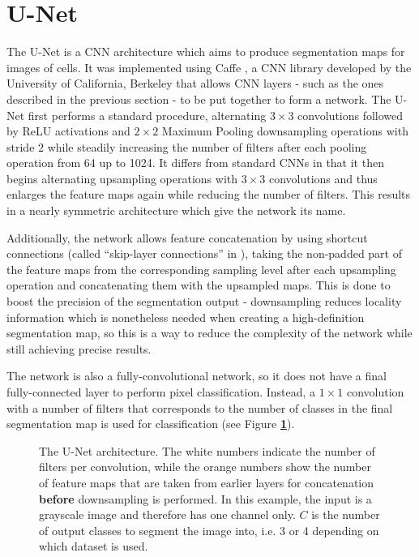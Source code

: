 	\section {U-Net}
The U-Net \cite{unet} is a CNN architecture which aims to produce segmentation maps for images of cells. It was implemented using Caffe \cite{caffe}, a CNN library developed by the University of California, Berkeley that allows CNN layers - such as the ones described in the previous section - to be put together to form a network. The U-Net first performs a standard procedure, alternating $3 \times 3$ convolutions followed by ReLU activations and $2 \times 2$ Maximum Pooling downsampling operations with stride $2$ while steadily increasing the number of filters after each pooling operation from 64 up to 1024. It differs from standard CNNs in that it then begins alternating upsampling operations with $3 \times 3$ convolutions and thus enlarges the feature maps again while reducing the number of filters. This results in a nearly symmetric architecture which give the network its name.

Additionally, the network allows feature concatenation by using shortcut connections (called ``skip-layer connections'' in \cite{bishop_pattern}), taking the non-padded part of the feature maps from the corresponding sampling level after each upsampling operation and concatenating them with the upsampled maps. This is done to boost the precision of the segmentation output - downsampling reduces locality information which is nonetheless needed when creating a high-definition segmentation map, so this is a way to reduce the complexity of the network while still achieving precise results.

The network is also a fully-convolutional network, so it does not have a final fully-connected layer to perform pixel classification. Instead, a $1 \times 1$ convolution with a number of filters that corresponds to the number of classes in the final segmentation map is used for classification (see Figure \textbf{\ref{fig:unet_arch}}).

\begin {figure}[!ht]
	\scalebox{0.75}{}
	\caption{The U-Net architecture. The white numbers indicate the number of filters per convolution, while the orange numbers show the number of feature maps that are taken from earlier layers for concatenation \textbf{before} downsampling is performed. In this example, the input is a grayscale image and therefore has one channel only. $C$ is the number of output classes to segment the image into, i.e. 3 or 4 depending on which dataset is used.}
	\label{fig:unet_arch}
\end {figure}
